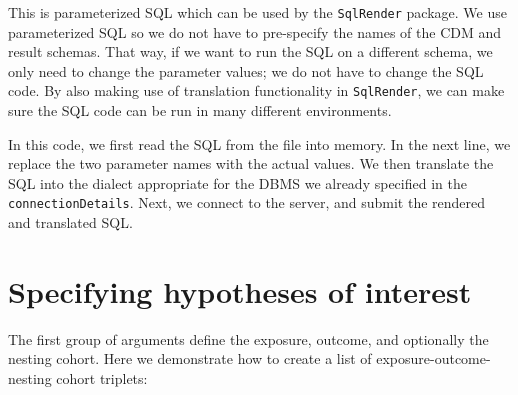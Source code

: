 \documentclass[]{article}
\newenvironment{Shaded}{\begin{snugshade}}{\end{snugshade}}
\newcommand{\DataTypeTok}[1]{\textcolor[rgb]{0.13,0.29,0.53}{#1}}
\newcommand{\KeywordTok}[1]{\textcolor[rgb]{0.13,0.29,0.53}{\textbf{#1}}}
\newcommand{\NormalTok}[1]{#1}
\newcommand{\OperatorTok}[1]{\textcolor[rgb]{0.81,0.36,0.00}{\textbf{#1}}}
\newcommand{\StringTok}[1]{\textcolor[rgb]{0.31,0.60,0.02}{#1}}
\begin{document}
This is parameterized SQL which can be used by the \texttt{SqlRender}
package. We use parameterized SQL so we do not have to pre-specify the
names of the CDM and result schemas. That way, if we want to run the SQL
on a different schema, we only need to change the parameter values; we
do not have to change the SQL code. By also making use of translation
functionality in \texttt{SqlRender}, we can make sure the SQL code can
be run in many different environments.

\begin{Shaded}
\end{Shaded}

In this code, we first read the SQL from the file into memory. In the
next line, we replace the two parameter names with the actual values. We
then translate the SQL into the dialect appropriate for the DBMS we
already specified in the \texttt{connectionDetails}. Next, we connect to
the server, and submit the rendered and translated SQL.

\hypertarget{specifying-hypotheses-of-interest}{%
\section{Specifying hypotheses of
interest}\label{specifying-hypotheses-of-interest}}

The first group of arguments define the exposure, outcome, and
optionally the nesting cohort. Here we demonstrate how to create a list
of exposure-outcome-nesting cohort triplets:
\end{document}
